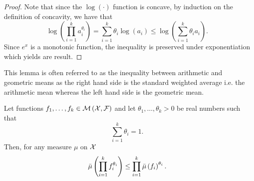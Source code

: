 \begin{proof}
Note that since the $\log\left(\cdot\right)$ function is concave,
by induction on the definition of concavity, we have that
\[
\log\left(\prod_{i=1}^{k}a_{i}^{\theta_{i}}\right)=\sum_{i=1}^{k}\theta_{i}\log\left(a_{i}\right)\leq\log\left(\sum_{i=1}^{k}\theta_{i}a_{i}\right).
\]
Since $e^{x}$ is a monotonic function, the inequality is preserved
under exponentiation which yields are result.
\end{proof}
\begin{rem*}
This lemma is often referred to as the inequality between arithmetic
and geometric means as the right hand side is the standard weighted
average i.e. the arithmetic mean whereas the left hand side is the
geometric mean.
\end{rem*}
\begin{prop}
\label{prop:generalizedHolder}Let functions $f_{1},\ldots,f_{k}\in\mathcal{M}\left(\mathcal{X},\mathcal{F}\right)$
and let $\theta_{1},\ldots,\theta_{k}>0$ be real numbers such that
\[
\sum_{i=1}^{k}\theta_{i}=1.
\]
Then, for any measure $\mu$ on $\mathcal{X}$
\[
\bar{\mu}\left(\prod_{i=1}^{k}f_{i}^{\theta_{i}}\right)\leq\prod_{i=1}^{k}\bar{\mu}\left(f_{i}\right)^{\theta_{i}}.
\]
\end{prop}

